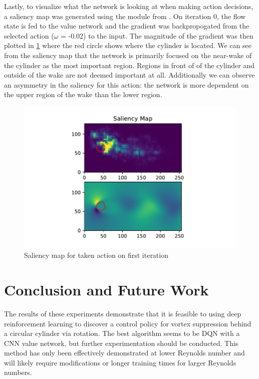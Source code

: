 \documentclass{article}
\begin{document}
Lastly, to visualize what the network is looking at when making action decisions, a saliency map was generated using the module from \cite{saliency}. On iteration 0, the flow state is fed to the value network and the gradient was backpropogated from the selected action ($\omega$ = -0.02) to the input. The magnitude of the gradient was then plotted in \cref{fig:saliency} where the red circle shows where the cylinder is located. We can see from the saliency map that the network is primarily focused on the near-wake of the cylinder as the most important region. Regions in front of of the cylinder and outside of the wake are not deemed important at all. Additionally we can observe an asymmetry in the saliency for this action: the network is more dependent on the upper region of the wake than the lower region. 
\begin{figure}
\centering
  \includegraphics[scale=0.6]{saliency_map}
  \caption{Saliency map for taken action on first iteration}
  \label{fig:saliency}
  \end{figure}

\section{Conclusion and Future Work}
\label{sec:conclusion}

The results of these experiments demonstrate that it is feasible to using deep reinforcement learning to discover a control policy for vortex suppression behind a circular cylinder via rotation. The best algorithm seems to be DQN with a CNN value network, but further experimentation should be conducted. This method has only been effectively demonstrated at lower Reynolds number and will likely require modifications or longer training times for larger Reynolds numbers. 
\end{document}
